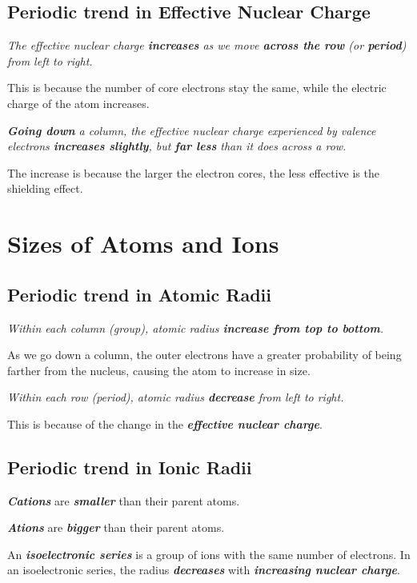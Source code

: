 \documentclass[12pt, a4paper]{report}
\newcommand{\impt}[1]{\textbf{\textit{#1}}}
\newcommand{\hi}{\section}
\newcommand{\hii}{\subsection}
\begin{document}
    \hii{Periodic trend in Effective Nuclear Charge}
        \par \textit{The effective nuclear charge \textbf{increases} as we move \textbf{across the
        row} (or \textbf{period}) from left to right.}
        \par This is because the number of core electrons stay the same, while the electric charge of
        the atom increases.
        \par \textit{\textbf{Going down} a column, the effective nuclear charge experienced by valence
        electrons \textbf{increases slightly}, but \textbf{far less} than it does across a row.}
        \par The increase is because the larger the electron cores, the less effective is the
        shielding effect.

\hi{Sizes of Atoms and Ions}
    \hii{Periodic trend in Atomic Radii}
        \par \textit{Within each column (group), atomic radius \textbf{increase from top to bottom}.}
        \par As we go down a column, the outer electrons have a greater probability of being
        farther from the nucleus, causing the atom to increase in size.
        \par \textit{Within each row (period), atomic radius \textbf{decrease} from left to right.}
        \par This is because of the change in the \impt{effective nuclear charge}.

    \hii{Periodic trend in Ionic Radii}
        \par \impt{Cations} are \impt{smaller} than their parent atoms.
        \par \impt{Ations} are \impt{bigger} than their parent atoms.
        \par An \impt{isoelectronic series} is a group of ions with the same number of electrons.
        In an isoelectronic series, the radius \impt{decreases} with \impt{increasing nuclear
        charge}.
\end{document}
